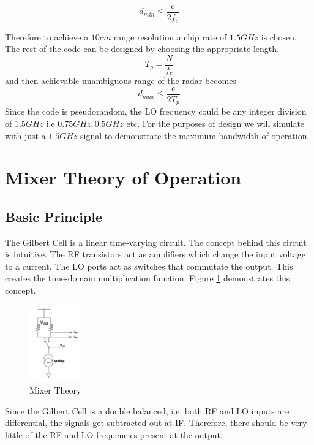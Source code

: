 \documentclass{article}                                                         %
\begin{document}
\begin{equation}
  \label{eq:rangeres}
  d_{min} \leq \dfrac{c}{2f_c}
\end{equation}

Therefore to achieve a $10cm$ range resolution a chip rate of $1.5 GHz$ is chosen. The rest of the code can be designed by
choosing the appropriate length. \\
\begin{equation}
  \label{eq:codelength}
  T_{p} = \dfrac{N}{f_c}
\end{equation}
and then achievable unambiguous range of the radar becomes
\begin{equation}
  \label{eq:maxrange}
  d_{max} \leq \dfrac{c}{2T_p}
\end{equation}
Since the code is pseudorandom, the LO frequency could be any integer division of $1.5GHz$ i.e $0.75GHz, 0.5GHz$ etc.
For the purposes of design we will simulate with just a $1.5GHz$ signal to demonstrate the maximum bandwidth of operation.
\newpage
\section{Mixer Theory of Operation}
\subsection{Basic Principle}

The Gilbert Cell is a linear time-varying circuit. The concept behind this circuit is intuitive. The RF transistors act as
amplifiers which change the input voltage to a current. The LO ports act as switches that commutate the output.
This creates the time-domain multiplication function. Figure \ref{fig:simpmix} demonstrates this concept.
\begin{figure}[H]
  \centering
  \includegraphics[width=0.2\textwidth] {Figures/gilbertSimple}
  \caption{Mixer Theory}
    \label{fig:simpmix}
\end{figure}

Since the Gilbert Cell is a double balanced, i.e. both RF and LO inputs are differential, the signals get subtracted out at IF. Therefore,
there should be very little of the RF and LO frequencies present at the output.
\end{document}
